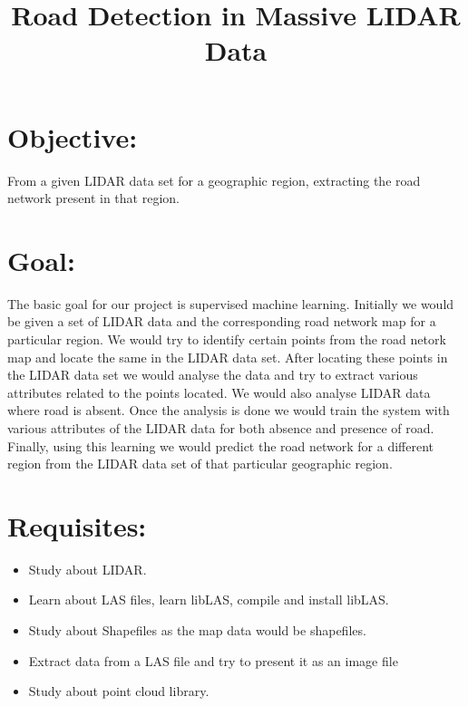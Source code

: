 \documentclass[12pt,letterpaper]{article}
\begin{document}
\title{Road Detection in Massive LIDAR Data}
\maketitle

\section{Objective:}
From a given LIDAR data set for a geographic region, extracting the road network present in that region.

\section{Goal:} 
The basic goal for our project is supervised machine learning. Initially we would be given a set of LIDAR data and the corresponding road network map for a particular region. We would try to identify certain points from the road netork map and locate the same in the LIDAR data set. After locating these points in the LIDAR data set we would analyse the data and try to extract various attributes related to the points located. We would also analyse LIDAR data where road is absent. Once the analysis is done we would train the system with various attributes of the LIDAR data for both absence and presence of road. Finally, using this learning we would predict the road network for a different region from the LIDAR data set of that particular geographic region.

\section{Requisites:}
\begin{itemize}
\item Study about LIDAR.
\item Learn about LAS files, learn libLAS, compile and install libLAS.
\item Study about Shapefiles as the map data would be shapefiles.
\item Extract data from a LAS file and try to present it as an image file
\item Study about point cloud library.
\end{itemize}
\end{document}
